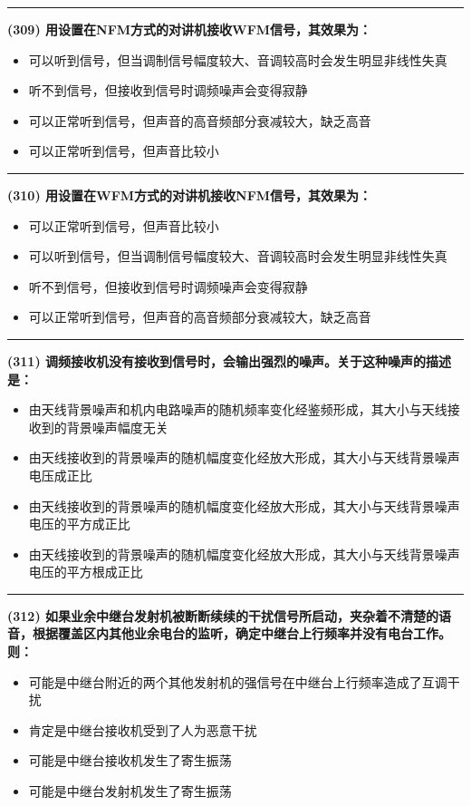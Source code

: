 \documentclass[twocolumn]{ctexart}  %
\begin{document}
\noindent\rule{0.5\textwidth}{1pt}
\heiti \textbf{(309) 用设置在NFM方式的对讲机接收WFM信号，其效果为：} \songti {\color{gray} [LK0788] }
\begin{itemize}
	\item  可以听到信号，但当调制信号幅度较大、音调较高时会发生明显非线性失真
	\item  听不到信号，但接收到信号时调频噪声会变得寂静
	\item  可以正常听到信号，但声音的高音频部分衰减较大，缺乏高音
	\item  可以正常听到信号，但声音比较小
\end{itemize}


\noindent\rule{0.5\textwidth}{1pt}
\heiti \textbf{(310) 用设置在WFM方式的对讲机接收NFM信号，其效果为：} \songti {\color{gray} [LK0789] }
\begin{itemize}
	\item  可以正常听到信号，但声音比较小
	\item  可以听到信号，但当调制信号幅度较大、音调较高时会发生明显非线性失真
	\item  听不到信号，但接收到信号时调频噪声会变得寂静
	\item  可以正常听到信号，但声音的高音频部分衰减较大，缺乏高音
\end{itemize}


\noindent\rule{0.5\textwidth}{1pt}
\heiti \textbf{(311) 调频接收机没有接收到信号时，会输出强烈的噪声。关于这种噪声的描述是：} \songti {\color{gray} [LK0790] }
\begin{itemize}
	\item  由天线背景噪声和机内电路噪声的随机频率变化经鉴频形成，其大小与天线接收到的背景噪声幅度无关
	\item  由天线接收到的背景噪声的随机幅度变化经放大形成，其大小与天线背景噪声电压成正比
	\item  由天线接收到的背景噪声的随机幅度变化经放大形成，其大小与天线背景噪声电压的平方成正比
	\item  由天线接收到的背景噪声的随机幅度变化经放大形成，其大小与天线背景噪声电压的平方根成正比
\end{itemize}


\noindent\rule{0.5\textwidth}{1pt}
\heiti \textbf{(312) 如果业余中继台发射机被断断续续的干扰信号所启动，夹杂着不清楚的语音，根据覆盖区内其他业余电台的监听，确定中继台上行频率并没有电台工作。则：} \songti {\color{gray} [LK0855] }
\begin{itemize}
	\item  可能是中继台附近的两个其他发射机的强信号在中继台上行频率造成了互调干扰
	\item  肯定是中继台接收机受到了人为恶意干扰
	\item  可能是中继台接收机发生了寄生振荡
	\item  可能是中继台发射机发生了寄生振荡
\end{itemize}
\end{document}
